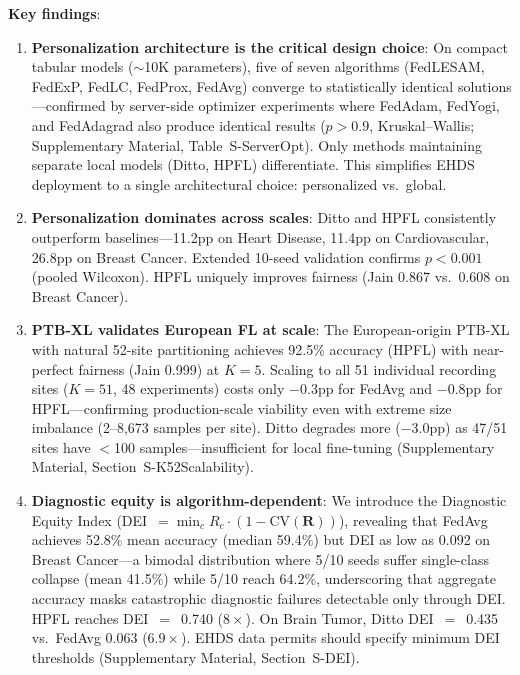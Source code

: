 \documentclass[conference]{IEEEtran}
\begin{document}
\textbf{Key findings}:

\begin{enumerate}
    \item \textbf{Personalization architecture is the critical design choice}: On compact tabular models ($\sim$10K parameters), five of seven algorithms (FedLESAM, FedExP, FedLC, FedProx, FedAvg) converge to statistically identical solutions---confirmed by server-side optimizer experiments where FedAdam, FedYogi, and FedAdagrad also produce identical results ($p{>}0.9$, Kruskal--Wallis; Supplementary Material, Table~S-ServerOpt). Only methods maintaining separate local models (Ditto, HPFL) differentiate. This simplifies EHDS deployment to a single architectural choice: personalized vs.\ global.

    \item \textbf{Personalization dominates across scales}: Ditto and HPFL consistently outperform baselines---11.2pp on Heart Disease, 11.4pp on Cardiovascular, 26.8pp on Breast Cancer. Extended 10-seed validation confirms $p < 0.001$ (pooled Wilcoxon). HPFL uniquely improves fairness (Jain 0.867 vs.\ 0.608 on Breast Cancer).

    \item \textbf{PTB-XL validates European FL at scale}: The European-origin PTB-XL with natural 52-site partitioning achieves 92.5\% accuracy (HPFL) with near-perfect fairness (Jain 0.999) at $K{=}5$. Scaling to all 51 individual recording sites ($K{=}51$, 48 experiments) costs only $-$0.3pp for FedAvg and $-$0.8pp for HPFL---confirming production-scale viability even with extreme size imbalance (2--8,673 samples per site). Ditto degrades more ($-$3.0pp) as 47/51 sites have $<$100 samples---insufficient for local fine-tuning (Supplementary Material, Section~S-K52Scalability).

    \item \textbf{Diagnostic equity is algorithm-dependent}: We introduce the Diagnostic Equity Index (DEI~$= \min_c R_c \cdot (1 - \text{CV}(\mathbf{R}))$), revealing that FedAvg achieves 52.8\% mean accuracy (median 59.4\%) but DEI as low as 0.092 on Breast Cancer---a bimodal distribution where 5/10 seeds suffer single-class collapse (mean 41.5\%) while 5/10 reach 64.2\%, underscoring that aggregate accuracy masks catastrophic diagnostic failures detectable only through DEI. HPFL reaches DEI~$=$~0.740 ($8\times$). On Brain Tumor, Ditto DEI~$=$~0.435 vs.\ FedAvg 0.063 ($6.9\times$). EHDS data permits should specify minimum DEI thresholds (Supplementary Material, Section~S-DEI).


\end{enumerate}
\end{document}
